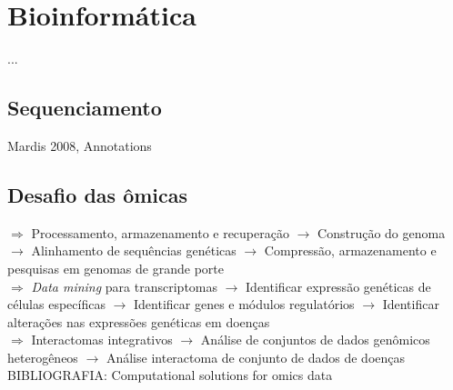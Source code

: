 \section{Bioinformática} \label{bioinformatica}
 \indent ...
\subsection{Sequenciamento} 

\indent Mardis 2008, Annotations


\subsection{Desafio das ômicas}

$\Rightarrow$ Processamento, armazenamento e recuperação
$\longrightarrow$ Construção do genoma
$\longrightarrow$ Alinhamento de sequências genéticas
$\longrightarrow$ Compressão, armazenamento e pesquisas em genomas de grande porte
\\
$\Rightarrow$ \textit{Data mining} para transcriptomas
$\longrightarrow$ Identificar expressão genéticas de células específicas
$\longrightarrow$ Identificar genes e módulos regulatórios
$\longrightarrow$ Identificar alterações nas expressões genéticas em doenças
\\
$\Rightarrow$ Interactomas integrativos
$\longrightarrow$ Análise de conjuntos de dados genômicos heterogêneos
$\longrightarrow$ Análise interactoma de conjunto de dados de doenças
\\
BIBLIOGRAFIA: Computational solutions for omics data

